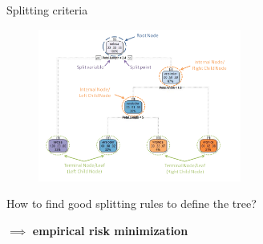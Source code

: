 \begin{frame}{Splitting criteria}

 \begin{figure}
    \centering
      \includegraphics[height = 5.0cm]{figure_man/labelling_of_tree.png}
    \end{figure}

How to find good splitting rules to define the tree?
\lz

$\implies$ \textbf{empirical risk minimization}

\end{frame}

